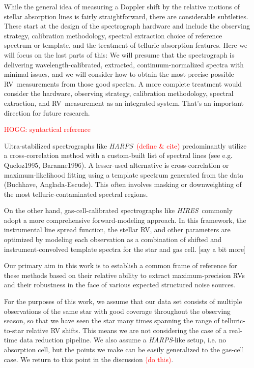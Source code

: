 \documentclass[modern]{aastex62}
\newcommand{\todo}[1]{\textcolor{red}{#1}}  %
\newcommand{\acronym}[1]{{\small{#1}}}
\newcommand{\project}[1]{\textsl{#1}}
\newcommand{\HARPS}{\project{\acronym{HARPS}}}
\newcommand{\HIRES}{\project{\acronym{HIRES}}}
\newcommand{\RV}{\acronym{RV}}
\begin{document}
While the general idea of measuring a Doppler shift by the relative
motions of stellar absorption lines is fairly straightforward, there
are considerable subtleties.
These start at the design of the spectrograph hardware
and include 
the observing strategy, calibration methodology, spectral extraction
choice of reference spectrum or template, and the treatment of telluric absorption
features.
Here we will focus on the last parts of this: We will presume that the
spectrograph is delivering wavelength-calibrated, extracted, continuum-normalized
spectra with minimal issues, and we will consider how to obtain the most
precise possible \RV\ measurements from those good spectra.
A more complete treatment would consider the hardware, observing strategy,
calibration methodology, spectral extraction, and \RV\ measurement as
an integrated system.
That's an important direction for future research.

\todo{HOGG: syntactical reference}

Ultra-stabilized spectrographs like \HARPS\ \todo{(define \& cite)}
predominantly utilize a cross-correlation method with a custom-built
list of spectral lines (see e.g. Queloz1995, Baranne1996).
A lesser-used alternative is cross-correlation or maximum-likelihood
fitting using a template spectrum generated from the data (Buchhave,
Anglada-Escude).
This often involves masking or downweighting of the most
telluric-contaminated spectral regions.

On the other hand, gas-cell-calibrated spectrographs like
\HIRES\ commonly adopt a more comprehensive forward-modeling approach.
In this framework, the instrumental line spread function, the stellar
RV, and other parameters are optimized by modeling each observation as
a combination of shifted and instrument-convolved template spectra for
the star and gas cell. [say a bit more]


Our primary aim in this work is to establish a common frame of reference for these methods based on their relative ability to extract maximum-precision RVs and their robustness in the face of various expected structured noise sources.

For the purposes of this work, we assume that our data set consists of multiple observations of the same star with good coverage throughout the observing season, so that we have seen the star many times spanning the range of telluric-to-star relative RV shifts. 
This means we are not considering the case of a real-time data reduction pipeline. 
We also assume a \HARPS-like setup, i.e. no absorption cell, but the points we make can be easily generalized to the gas-cell case. 
We return to this point in the discussion \todo{(do this)}.
\end{document}
